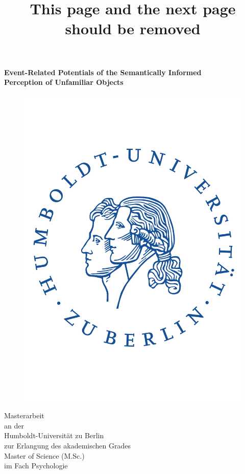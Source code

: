 \documentclass[
  english,
  doc,12pt,twoside,floatsintext]{apa7}
\title{This page and the next page should be removed}
\author{\textsuperscript{}}
\date{}
\affiliation{\vspace{0.5cm}\textsuperscript{} }
\begin{document}
\maketitle

\clearpage

\mbox{}\thispagestyle{empty}\clearpage

\thispagestyle{empty}
\begin{center}
\vspace*{10mm}
\textbf{Event-Related Potentials of the Semantically Informed}\\
\textbf{Perception of Unfamiliar Objects}\\
\vspace*{5mm}
\begin{figure}[h]
\begin{center}
\includegraphics[width=!,totalheight=!,scale=0.25]{master_thesis_files/hu_logo}
\end{center}
\end{figure}
{
Masterarbeit\\
an der\\
Humboldt-Universität zu Berlin\\
zur Erlangung des akademischen Grades \\
Master of Science (M.Sc.)\\
im Fach Psychologie\\
\vspace*{25mm}
}
\end{center}
\end{document}
